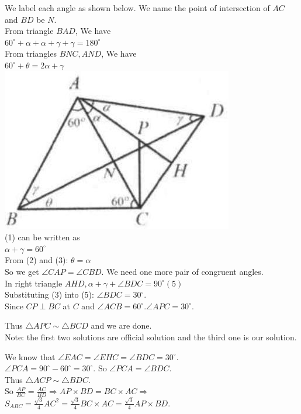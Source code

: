 \documentclass{article}
\begin{document}
We label each angle as shown below. We name the point of intersection of \(A C\) and \(B D\) be \(N\).\\
From triangle \(B A D\), We have\\
\(60^{\circ}+\alpha+\alpha+\gamma+\gamma=180^{\circ}\)\\
From triangles \(B N C, A N D\), We have\\
\(60^{\circ}+\theta=2 \alpha+\gamma\)\\
\centering
\includegraphics[width=\textwidth]{images/199.jpg}\\
(1) can be written as\\
\(\alpha+\gamma=60^{\circ}\)\\
From (2) and (3): \(\theta=\alpha\)\\
So we get \(\angle C A P=\angle C B D\). We need one more pair of congruent angles.\\
In right triangle \(A H D, \alpha+\gamma+\angle B D C=90^{\circ}(5)\)\\
Substituting (3) into (5): \(\angle B D C=30^{\circ}\).\\
Since \(C P \perp B C\) at \(C\) and \(\angle A C B=60^{\circ} . \angle A P C=30^{\circ}\).

Thus \(\triangle A P C \sim \triangle B C D\) and we are done.\\
Note: the first two solutions are official solution and the third one is our solution.


We know that \(\angle E A C=\angle E H C=\angle B D C=30^{\circ}\).\\
\(\angle P C A=90^{\circ}-60^{\circ}=30^{\circ}\). So \(\angle P C A=\angle B D C\).\\
Thus \(\triangle A C P \sim \triangle B D C\).\\
So \(\frac{A P}{B C}=\frac{A C}{B D} \Rightarrow A P \times B D=B C \times A C \Rightarrow\)\\
\(S_{A B C}=\frac{\sqrt{3}}{4} A C^{2}=\frac{\sqrt{3}}{4} B C \times A C=\frac{\sqrt{3}}{4} A P \times B D\).
\end{document}
